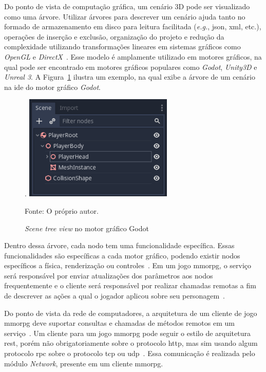 Do ponto de vista de computação gráfica, um cenário 3D pode ser visualizado como uma árvore.
%
Utilizar árvores para descrever um cenário ajuda tanto no formado de armazenamento em disco para leitura facilitada (\textit{e.g.}, \ac{json}, \ac{xml}, etc.), operações de inserção e exclusão, organização do projeto e redução da complexidade utilizando transformações lineares em sistemas gráficos como \textit{OpenGL} e \textit{DirectX}~\cite{Lengyel2011Jun}.
%
Esse modelo é amplamente utilizado em motores gráficos, na qual pode ser encontrado em motores gráficos populares como \textit{Godot}, \textit{Unity3D} e \textit{Unreal 3}.
%
A Figura~\ref{fig:scene_tree} ilustra um exemplo, na qual exibe a árvore de um cenário na \ac{ide} do motor gráfico \textit{Godot}.



\begin{figure}[htb!]
\caption{\textit{Scene tree view} no motor gráfico Godot}.
\label{fig:scene_tree}
\includegraphics[height=5cm]{img/cap2/scene_tree.png}
\centering

Fonte: O próprio autor.
\end{figure}



Dentro dessa árvore, cada nodo tem uma funcionalidade específica.
%
Essas funcionalidades são específicas a cada motor gráfico, podendo existir nodos específicos a física, renderização ou controles~\cite{godot_docs}.
%
Em um jogo \ac{mmorpg}, o serviço será responsável por enviar atualizações dos parâmetros aos nodos frequentemente e o cliente será responsável por realizar chamadas remotas a fim de descrever as ações a qual o jogador aplicou sobre seu personagem~\cite{photon_engine}.


Do ponto de vista da rede de computadores, a arquitetura de um cliente de jogo \ac{mmorpg} deve suportar consultas e chamadas de métodos remotos em um serviço~\cite{albion_online_unite}.
%
Um cliente para um jogo \ac{mmorpg} pode seguir o estilo de arquitetura \ac{rest}, porém não obrigatoriamente sobre o protocolo \ac{http}, mas sim usando algum protocolo \ac{rpc} sobre o protocolo \ac{tcp} ou \ac{udp}~\cite{albion_online_unite, stephenclarkewillson2017}.
%
Essa comunicação é realizada pelo módulo \textit{Network}, presente em um cliente \ac{mmorpg}.


